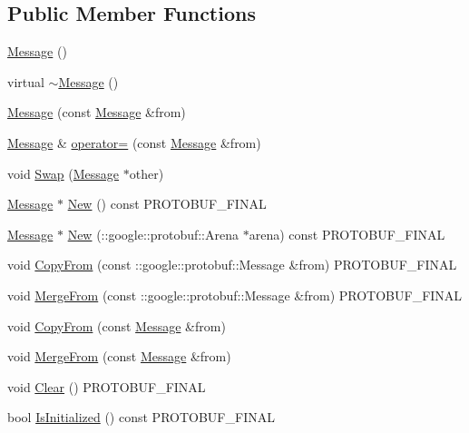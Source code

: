 \subsection*{Public Member Functions}
\begin{DoxyCompactItemize}
\item 
\hyperlink{class_message_a4fc4f717b634e66070366cb7722d7761}{Message} ()
\item 
virtual \hyperlink{class_message_a3f7275462831f787a861271687bcad67}{$\sim$\+Message} ()
\item 
\hyperlink{class_message_ae5690269cddc346084a2cb6017acd286}{Message} (const \hyperlink{class_message}{Message} \&from)
\item 
\hyperlink{class_message}{Message} \& \hyperlink{class_message_aaf5c447bbab6306a94f2260718163681}{operator=} (const \hyperlink{class_message}{Message} \&from)
\item 
void \hyperlink{class_message_a6fabda3c4c2c71f1b9607e136dee483e}{Swap} (\hyperlink{class_message}{Message} $\ast$other)
\item 
\hyperlink{class_message}{Message} $\ast$ \hyperlink{class_message_a7c0fa750d5725069af260579f0006b74}{New} () const P\+R\+O\+T\+O\+B\+U\+F\+\_\+\+F\+I\+N\+AL
\item 
\hyperlink{class_message}{Message} $\ast$ \hyperlink{class_message_a999f73547788c977054d3e28f3ae1761}{New} (\+::google\+::protobuf\+::\+Arena $\ast$arena) const P\+R\+O\+T\+O\+B\+U\+F\+\_\+\+F\+I\+N\+AL
\item 
void \hyperlink{class_message_aace762966fec95ac8649947cf4418f28}{Copy\+From} (const \+::google\+::protobuf\+::\+Message \&from) P\+R\+O\+T\+O\+B\+U\+F\+\_\+\+F\+I\+N\+AL
\item 
void \hyperlink{class_message_adbc529475b8405b11e0c4218cf0ca67b}{Merge\+From} (const \+::google\+::protobuf\+::\+Message \&from) P\+R\+O\+T\+O\+B\+U\+F\+\_\+\+F\+I\+N\+AL
\item 
void \hyperlink{class_message_abd25f3bb289b59841d064eb218d21e9c}{Copy\+From} (const \hyperlink{class_message}{Message} \&from)
\item 
void \hyperlink{class_message_aeec4936f78a3ed399295e3f72840166f}{Merge\+From} (const \hyperlink{class_message}{Message} \&from)
\item 
void \hyperlink{class_message_a99a19d1b45d1510b23bbb91d4cb81681}{Clear} () P\+R\+O\+T\+O\+B\+U\+F\+\_\+\+F\+I\+N\+AL
\item 
bool \hyperlink{class_message_acdfc5073e447c1c3aea9524e66be794f}{Is\+Initialized} () const P\+R\+O\+T\+O\+B\+U\+F\+\_\+\+F\+I\+N\+AL

\end{DoxyCompactItemize}
